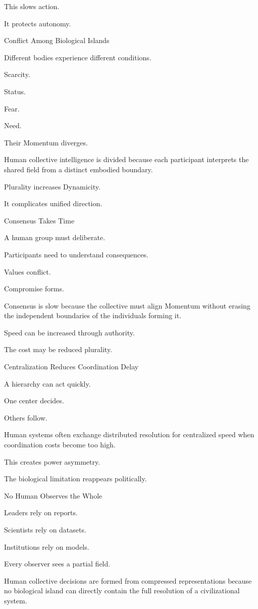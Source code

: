 This slows action.

It protects autonomy.

Conflict Among Biological Islands

Different bodies experience different conditions.

Scarcity.

Status.

Fear.

Need.

Their Momentum diverges.

Human collective intelligence is divided because each participant interprets the shared field from a distinct embodied boundary.

Plurality increases Dynamicity.

It complicates unified direction.

Consensus Takes Time

A human group must deliberate.

Participants need to understand consequences.

Values conflict.

Compromise forms.

Consensus is slow because the collective must align Momentum without erasing the independent boundaries of the individuals forming it.

Speed can be increased through authority.

The cost may be reduced plurality.

Centralization Reduces Coordination Delay

A hierarchy can act quickly.

One center decides.

Others follow.

Human systems often exchange distributed resolution for centralized speed when coordination costs become too high.

This creates power asymmetry.

The biological limitation reappears politically.

No Human Observes the Whole

Leaders rely on reports.

Scientists rely on datasets.

Institutions rely on models.

Every observer sees a partial field.

Human collective decisions are formed from compressed representations because no biological island can directly contain the full resolution of a civilizational system.

